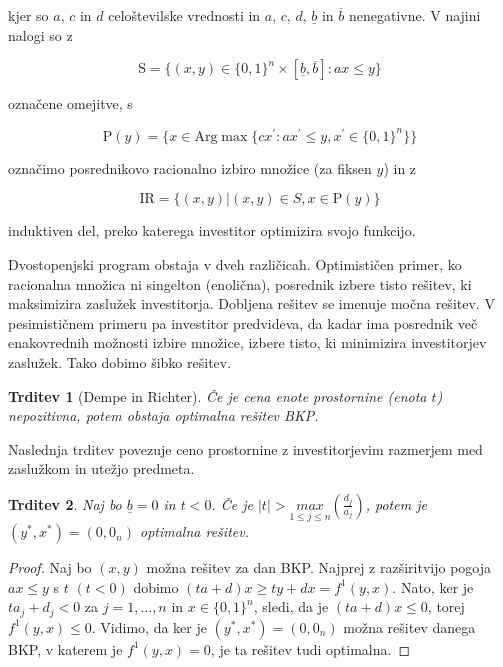 \documentclass[a4paper, 11pt]{article}
\newtheorem{theorem}{Trditev}
\begin{document}
	
kjer so $a$, $c$ in $d$ celoštevilske vrednosti in $a$, $c$, $d$, $\underline{b}$ in $\overline{b}$ nenegativne. V najini nalogi so z
	
	$$ \text{S} = \{ (x, y) \in \{ 0, 1 \}^n \times \left[ \underline{b}, \overline{b} \right]: ax \leq y\} $$ 
	
	označene omejitve, s 
	
	$$ \text{P}(y) = \{ x \in \text{Arg}\max \{ cx^\prime: ax^\prime \leq y, x^\prime \in \{ 0,1\}^n \} \}$$
	
	označimo posrednikovo racionalno izbiro množice (za fiksen $y$) in z 
	
	$$ \text{IR} = \{ (x,y)  | (x,y) \in S, x \in \text{P}(y) \} $$
	
	induktiven del, preko katerega investitor optimizira svojo funkcijo.
	
	Dvostopenjski program obstaja v dveh različicah. Optimističen primer, ko racionalna množica ni singelton (enolična), posrednik izbere tisto rešitev, ki maksimizira zaslužek investitorja. Dobljena rešitev se imenuje močna rešitev. V pesimističnem primeru pa investitor predvideva, da kadar ima posrednik več enakovrednih možnosti izbire množice, izbere tisto, ki minimizira investitorjev zaslužek. Tako dobimo šibko rešitev.
	
	\begin{theorem}[Dempe in Richter]
	Če je cena enote prostornine (enota $t$) nepozitivna, potem obstaja optimalna rešitev BKP.
	\label{trditev1}
	\end{theorem}
	
	Naslednja trditev povezuje ceno prostornine z investitorjevim razmerjem med zaslužkom in utežjo predmeta.
	
	\begin{theorem}
	Naj bo $\underline{b} = 0$ in $t < 0$. Če je  $| t | > \underset{1 \leq j \leq n}{max}(\frac{d_j}{a_j})$,  potem je $(y^*, x^*) = (0, 0_n)$ optimalna rešitev.
	\end{theorem}
	
	\begin{proof}
	Naj bo $(x, y)$ možna rešitev za dan BKP. Najprej z razširitvijo pogoja $ ax \leq y$ s $t$ $(t < 0)$ dobimo $(ta + d)x \geq ty + dx = f^{1}(y,x)$. Nato, ker je $ta_j + d_j < 0$ za $j = 1, \dots , n$ in $ x \in \{0, 1 \}^n$, sledi, da je $(ta + d)x \leq 0$, torej $f^{1}(y,x) \leq 0$. Vidimo, da ker je $(y^*, x^*) = (0, 0_n)$ možna rešitev danega BKP, v katerem je $f^{1}(y,x) = 0$, je ta rešitev tudi optimalna.
	\end{proof}
	
\end{document}
